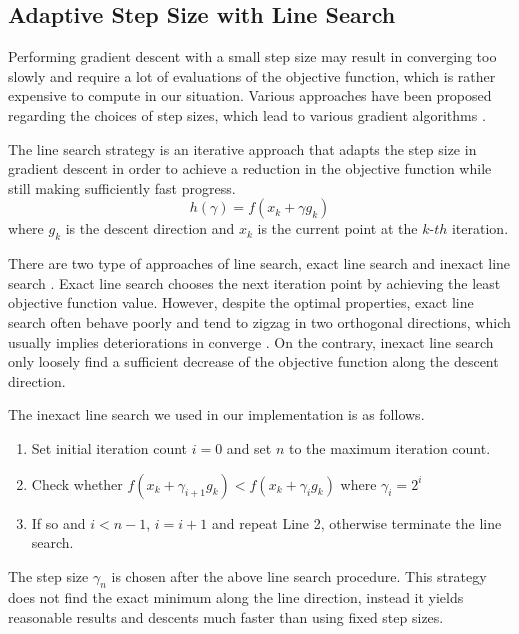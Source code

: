 
\subsection{Adaptive Step Size with Line Search}
Performing gradient descent with a small step size may result in converging too slowly and require a lot of evaluations of the objective function, which is rather expensive to compute in our situation. Various approaches have been proposed regarding the choices of step sizes, which lead to various gradient algorithms \cite{yuan_step-sizes_2008}.

The line search strategy is an iterative approach that adapts the step size in gradient descent in order to achieve a reduction in the objective function while still making sufficiently fast progress.
\[ h( \gamma)=f(x_{k}+\gamma g_{k}) \]
where $ g_{k} $ is the descent direction and $ x_{k} $ is the current point at the $ k$-$th $ iteration.

There are two type of approaches of line search, exact line search and inexact line search \cite{vrahatis_class_2000}.
Exact line search chooses the next iteration point by achieving the least objective function value. However, despite the optimal properties, exact line search often behave poorly and tend to zigzag in two orthogonal directions, which usually implies deteriorations in converge \cite{zhou_gradient_2006}.
On the contrary, inexact line search only loosely find a sufficient decrease of the objective function along the descent direction.

The inexact line search we used in our implementation is as follows.

\begin{enumerate}
	\item Set initial iteration count $ i=0 $ and set $ n $ to the maximum iteration count.
	\item Check whether $ f(x_{k}+\gamma_{i+1} g_{k}) < f(x_{k}+\gamma_{i} g_{k}) $ where $ \gamma_{i}=2^{i} $
	\item If so and $ i<n-1 $, $ i=i+1 $ and repeat Line 2, otherwise terminate the line search.
\end{enumerate}

The step size $ \gamma_{n} $ is chosen after the above line search procedure.
This strategy does not find the exact minimum along the line direction, instead it yields reasonable results and descents much faster than using fixed step sizes.

